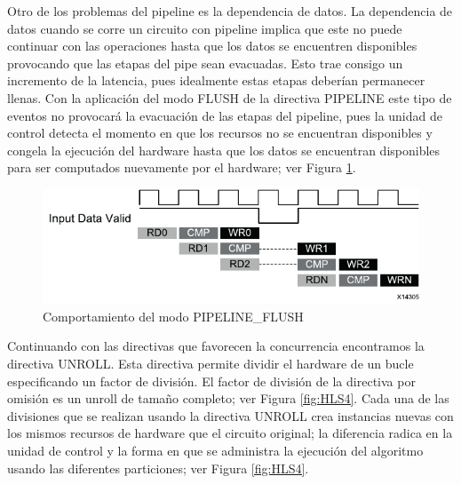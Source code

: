 Otro de los problemas del pipeline es la dependencia de datos. La dependencia de datos cuando se corre un circuito con pipeline implica que este no puede continuar con las operaciones hasta que los datos se encuentren disponibles provocando que las etapas del pipe sean evacuadas. Esto trae consigo un incremento de la latencia, pues idealmente estas etapas deberían permanecer llenas. Con la aplicación del modo FLUSH de la directiva PIPELINE este tipo de eventos no provocará la evacuación de las etapas del pipeline, pues la unidad de control detecta el momento en que los recursos no se encuentran disponibles y congela la ejecución del hardware hasta que los datos se encuentran disponibles para ser computados nuevamente por el hardware; ver Figura \ref{fig:HLS3}.

\begin{figure}[H]
  \centering
    \includegraphics[scale=0.8]{./Figures/HLS3.pdf}
  \caption{Comportamiento del modo PIPELINE\_FLUSH \citep{HLS2015}}
  \label{fig:HLS3}
\end{figure}

Continuando con las directivas que favorecen la concurrencia encontramos la directiva UNROLL. Esta directiva permite dividir el hardware de un bucle especificando un factor de división. El factor de división de la directiva por omisión es un unroll de tamaño completo; ver Figura \ref{fig:HLS4}. Cada una de las divisiones que se realizan usando la directiva UNROLL crea instancias nuevas con los mismos recursos de hardware que el circuito original; la diferencia radica en la unidad de control y la forma en que se administra la ejecución del algoritmo usando las diferentes particiones; ver Figura \ref{fig:HLS4}.

